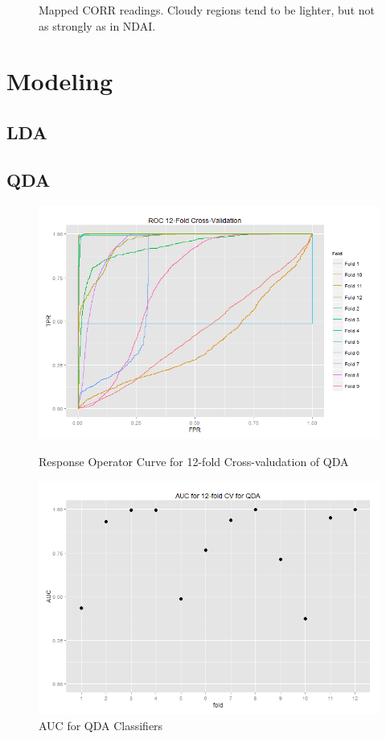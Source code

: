 \documentclass{article}\usepackage[]{graphicx}\usepackage[]{color}
\begin{document}
\begin{figure}
\caption{Mapped CORR readings. Cloudy regions tend to be lighter, but not as strongly as in NDAI.}
\end{figure}

\section{Modeling}

\subsection{LDA}

\subsection{QDA}

\begin{figure}[h]
  \includegraphics[width=\linewidth]{QDArocCV.png}
  \caption{Response Operator Curve for 12-fold Cross-valudation of QDA}\label{}
\endminipage\hfill
{}
  \includegraphics[width=\linewidth]{AUCcvQDA.png}
  \caption{AUC for QDA Classifiers}\label{rocauc}
\endminipage\hfill
\end{figure}
\end{document}
